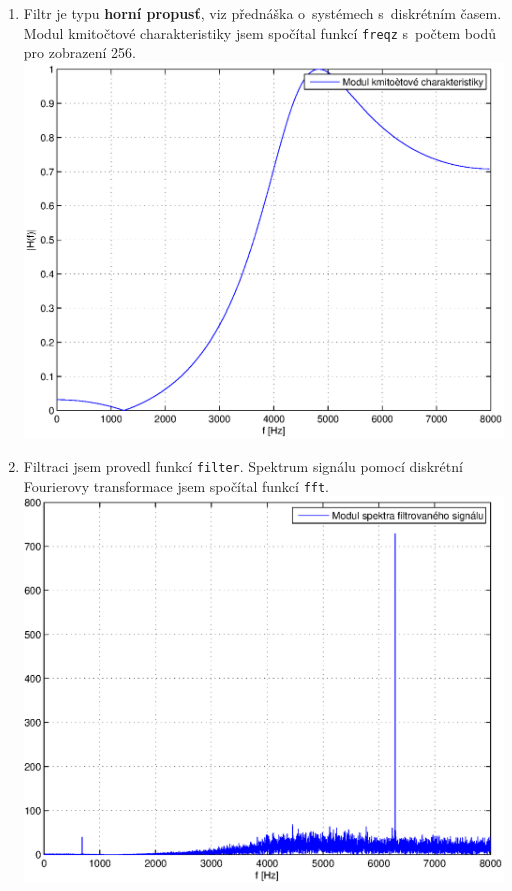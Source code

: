 \documentclass[a4paper, 11pt, twocolumn]{article}
\begin{document}
\begin{enumerate}
		\item
			Filtr je typu \textbf{horní propusť}, viz přednáška o~systémech s~diskrétním časem.
			Modul kmitočtové charakteristiky jsem spočítal funkcí \texttt{freqz} s~počtem bodů pro
			zobrazení 256.
			\\ \includegraphics[width=\linewidth]{inc/5.eps}

		\item
			Filtraci jsem provedl funkcí \texttt{filter}. Spektrum signálu pomocí diskrétní
			Fourierovy transformace jsem spočítal funkcí \texttt{fft}.
			\\ \includegraphics[width=\linewidth]{inc/6.eps}


\end{enumerate}
\end{document}
